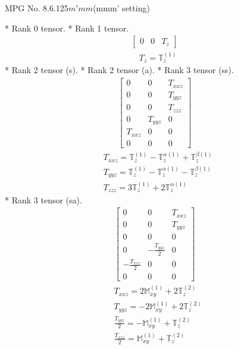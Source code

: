 \documentclass[fleqn,8pt,landscape]{jsarticle}
\begin{document}
\setcounter{MaxMatrixCols}{32}

\renewcommand{\tablename}{Table~}
\renewcommand{\figurename}{Figure~}
\begin{center}
\LARGE
MPG No. 8.6.125\quad$m'mm$\quad(mmm' setting)
\end{center}
* Rank 0 tensor.
* Rank 1 tensor.
\begin{align*}
\begin{bmatrix} 0 & 0 & T_{z} \end{bmatrix}
\end{align*}
\begin{align*}
& T_{z} = \mathbb{T}_{z}^{(1)}
\end{align*}
* Rank 2 tensor (s).
* Rank 2 tensor (a).
* Rank 3 tensor (ss).
\begin{align*}
\begin{bmatrix} 0 & 0 & T_{xxz} \\ 0 & 0 & T_{yyz} \\ 0 & 0 & T_{zzz} \\ 0 & T_{yyz} & 0 \\ T_{xxz} & 0 & 0 \\ 0 & 0 & 0 \end{bmatrix}
\end{align*}
\begin{align*}
& T_{xxz} = \mathbb{T}_{z}^{(1)} - \mathbb{T}_{z}^{\alpha(1)} + \mathbb{T}_{z}^{\beta(1)} \\
& T_{yyz} = \mathbb{T}_{z}^{(1)} - \mathbb{T}_{z}^{\alpha(1)} - \mathbb{T}_{z}^{\beta(1)} \\
& T_{zzz} = 3 \mathbb{T}_{z}^{(1)} + 2 \mathbb{T}_{z}^{\alpha(1)}
\end{align*}
* Rank 3 tensor (sa).
\begin{align*}
\begin{bmatrix} 0 & 0 & T_{xxz} \\ 0 & 0 & T_{yyz} \\ 0 & 0 & 0 \\ 0 & - \frac{T_{yyz}}{2} & 0 \\ - \frac{T_{xxz}}{2} & 0 & 0 \\ 0 & 0 & 0 \end{bmatrix}
\end{align*}
\begin{align*}
& T_{xxz} = 2 \mathbb{M}_{xy}^{(1)} + 2 \mathbb{T}_{z}^{(2)} \\
& T_{yyz} = - 2 \mathbb{M}_{xy}^{(1)} + 2 \mathbb{T}_{z}^{(2)} \\
& \frac{T_{yyz}}{2} = - \mathbb{M}_{xy}^{(1)} + \mathbb{T}_{z}^{(2)} \\
& \frac{T_{xxz}}{2} = \mathbb{M}_{xy}^{(1)} + \mathbb{T}_{z}^{(2)}
\end{align*}
\end{document}
